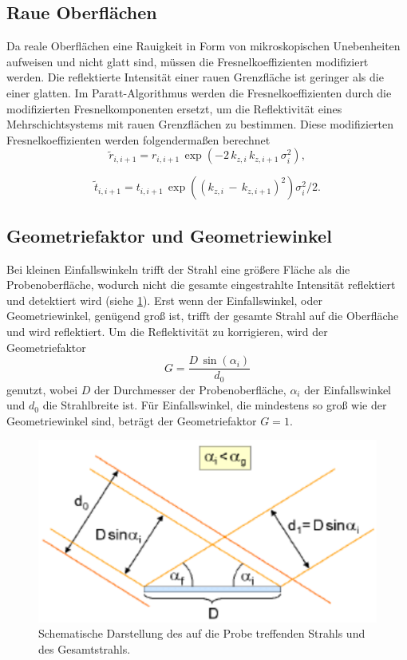 \subsection{Raue Oberflächen}
Da reale Oberflächen eine Rauigkeit in Form von mikroskopischen Unebenheiten aufweisen und nicht glatt sind, müssen die Fresnelkoeffizienten modifiziert werden. Die reflektierte Intensität einer rauen Grenzfläche ist geringer als die einer glatten. Im Paratt-Algorithmus werden die Fresnelkoeffizienten durch die modifizierten Fresnelkomponenten ersetzt, um die Reflektivität eines Mehrschichtsystems mit rauen Grenzflächen zu bestimmen. Diese modifizierten Fresnelkoeffizienten werden folgendermaßen berechnet
\begin{equation}
    \tilde{r}_{i,i+1} = r_{i,i+1} \, \exp(-2 \, k_{z,i} \, k_{z,i+1} \, \sigma^2_i),
\end{equation}

\begin{equation}
    \tilde{t}_{i,i+1} = t_{i,i+1} \, \exp((k_{z,i} \, - \, k_{z,i+1})^2) \sigma^2_i / 2.
\end{equation}



\subsection{Geometriefaktor und Geometriewinkel}
Bei kleinen Einfallswinkeln trifft der Strahl eine größere Fläche als die Probenoberfläche, wodurch nicht die gesamte eingestrahlte Intensität reflektiert und detektiert wird (siehe \ref{fig:Geometriewinkel}).
Erst wenn der Einfallswinkel, oder Geometriewinkel, genügend groß ist, trifft der gesamte Strahl auf die Oberfläche und wird reflektiert.
Um die Reflektivität zu korrigieren, wird der Geometriefaktor
\begin{equation}
    G = \frac{D \, \sin(\alpha_i)}{d_0}
\end{equation}
genutzt, wobei $D$ der Durchmesser der Probenoberfläche, $\alpha_i$ der Einfallswinkel und $d_0$ die Strahlbreite ist.
Für Einfallswinkel, die mindestens so groß wie der Geometriewinkel sind, beträgt der Geometriefaktor $G = 1$. 

\begin{figure}
    \centering
    \includegraphics[width=0.7\linewidth]{./figures/Geometriewinkel.png}
    \caption{Schematische Darstellung des auf die Probe treffenden Strahls und des Gesamtstrahls. \cite{anleitung}} %
    \label{fig:Geometriewinkel}
\end{figure}



